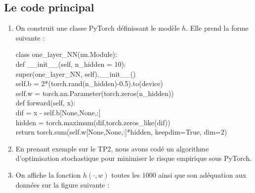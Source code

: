\documentclass[12pt,a4paper]{article}
\newcommand{\code}[1]{%
    \begin{tcolorbox}[colback=black!10!white,colframe=black]
        #1
    \end{tcolorbox}
}
\begin{document}
\subsection{Le code principal}

\begin{enumerate}
    \item On construit une classe PyTorch définissant le modèle $h$.
    Elle prend la forme suivante :

    \code{
        class one\_layer\_NN(nn.Module):\\
        \indent\qquad def \_\_init\_\_(self, n\_hidden = 10):\\
        \indent\qquad \qquad super(one\_layer\_NN, self).\_\_init\_\_()\\
        \indent \qquad \qquad self.b = 2*(torch.rand(n\_hidden)-0.5).to(device)\\
        \indent \qquad \qquad self.w = torch.nn.Parameter(torch.zeros(n\_hidden))\\
        \indent \qquad def forward(self, x):\\
        \indent \qquad \qquad dif = x - self.b[None,None,:]\\
        \indent \qquad \qquad hidden = torch.maximum(dif,torch.zeros\_like(dif))\\
        \indent \qquad \qquad return torch.sum(self.w[None,None,:]*hidden, keepdim=True, dim=2)
    }

    \item En prenant exemple sur le TP2, nous avons codé un algorithme d’optimisation stochastique pour minimiser le risque empirique sous PyTorch.\\
    

\newpage

    \item On affiche la fonction $h(\cdot, w)$ toutes les $1000$ ainsi que son adéquation aux données sur la figure suivante :
    

\end{enumerate}
\end{document}
